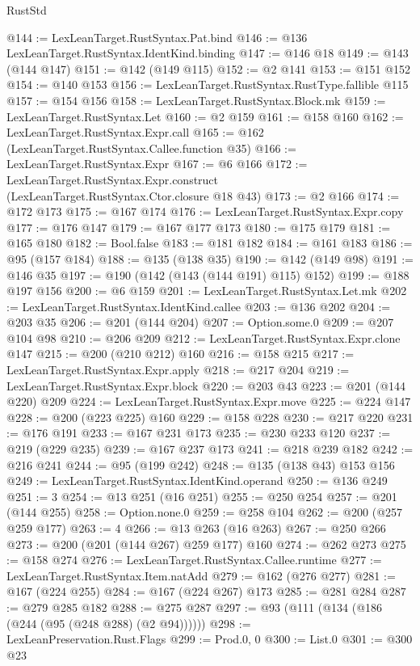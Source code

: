 \begin{lexlean}{RustStd}
\begin{coremodule}
@144 := LexLeanTarget.RustSyntax.Pat.bind
@146 := @136 LexLeanTarget.RustSyntax.IdentKind.binding
@147 := @146 @18
@149 := @143 (@144 @147)
@151 := @142 (@149 @115)
@152 := @2 @141
@153 := @151 @152
@154 := @140 @153
@156 := LexLeanTarget.RustSyntax.RustType.fallible @115
@157 := @154 @156
@158 := LexLeanTarget.RustSyntax.Block.mk
@159 := LexLeanTarget.RustSyntax.Let
@160 := @2 @159
@161 := @158 @160
@162 := LexLeanTarget.RustSyntax.Expr.call
@165 := @162 (LexLeanTarget.RustSyntax.Callee.function @35)
@166 := LexLeanTarget.RustSyntax.Expr
@167 := @6 @166
@172 := LexLeanTarget.RustSyntax.Expr.construct (LexLeanTarget.RustSyntax.Ctor.closure @18 @43)
@173 := @2 @166
@174 := @172 @173
@175 := @167 @174
@176 := LexLeanTarget.RustSyntax.Expr.copy
@177 := @176 @147
@179 := @167 @177 @173
@180 := @175 @179
@181 := @165 @180
@182 := Bool.false
@183 := @181 @182
@184 := @161 @183
@186 := @95 (@157 @184)
@188 := @135 (@138 @35)
@190 := @142 (@149 @98)
@191 := @146 @35
@197 := @190 (@142 (@143 (@144 @191) @115) @152)
@199 := @188 @197 @156
@200 := @6 @159
@201 := LexLeanTarget.RustSyntax.Let.mk
@202 := LexLeanTarget.RustSyntax.IdentKind.callee
@203 := @136 @202
@204 := @203 @35
@206 := @201 (@144 @204)
@207 := Option.some.{0}
@209 := @207 @104 @98
@210 := @206 @209
@212 := LexLeanTarget.RustSyntax.Expr.clone @147
@215 := @200 (@210 @212) @160
@216 := @158 @215
@217 := LexLeanTarget.RustSyntax.Expr.apply
@218 := @217 @204
@219 := LexLeanTarget.RustSyntax.Expr.block
@220 := @203 @43
@223 := @201 (@144 @220) @209
@224 := LexLeanTarget.RustSyntax.Expr.move
@225 := @224 @147
@228 := @200 (@223 @225) @160
@229 := @158 @228
@230 := @217 @220
@231 := @176 @191
@233 := @167 @231 @173
@235 := @230 @233 @120
@237 := @219 (@229 @235)
@239 := @167 @237 @173
@241 := @218 @239 @182
@242 := @216 @241
@244 := @95 (@199 @242)
@248 := @135 (@138 @43) @153 @156
@249 := LexLeanTarget.RustSyntax.IdentKind.operand
@250 := @136 @249
@251 := 3
@254 := @13 @251 (@16 @251)
@255 := @250 @254
@257 := @201 (@144 @255)
@258 := Option.none.{0}
@259 := @258 @104
@262 := @200 (@257 @259 @177)
@263 := 4
@266 := @13 @263 (@16 @263)
@267 := @250 @266
@273 := @200 (@201 (@144 @267) @259 @177) @160
@274 := @262 @273
@275 := @158 @274
@276 := LexLeanTarget.RustSyntax.Callee.runtime
@277 := LexLeanTarget.RustSyntax.Item.natAdd
@279 := @162 (@276 @277)
@281 := @167 (@224 @255)
@284 := @167 (@224 @267) @173
@285 := @281 @284
@287 := @279 @285 @182
@288 := @275 @287
@297 := @93 (@111 (@134 (@186 (@244 (@95 (@248 @288) (@2 @94))))))
@298 := LexLeanPreservation.Rust.Flags
@299 := Prod.{0, 0}
@300 := List.{0}
@301 := @300 @23

\end{coremodule}
\end{lexlean}
